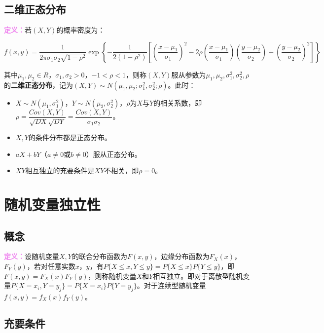 \documentclass[UTF8, 12pt]{ctexart}
\begin{document}
\subsection{二维正态分布}

\textcolor{violet}{\textbf{定义：}}若$(X,Y)$的概率密度为：

{\fontsize{8.2pt}{10pt}$f(x,y)=\dfrac{1}{2\pi\sigma_1\sigma_2\sqrt{1-\rho^2}}\exp\left\{-\dfrac{1}{2(1-\rho^2)}\left[\left(\dfrac{x-\mu_1}{\sigma_1}\right)^2-2\rho\left(\dfrac{x-\mu_1}{\sigma_1}\right)\left(\dfrac{y-\mu_2}{\sigma_2}\right)+\left(\dfrac{y-\mu_2}{\sigma_2}\right)^2\right]\right\}$}

其中$\mu_1,\mu_2\in R$，$\sigma_1,\sigma_2>0$，$-1<\rho<1$，则称$(X,Y)$服从参数为$\mu_1,\mu_2,\sigma_1^2,\sigma_2^2,\rho$的\textbf{二维正态分布}，记为$(X,Y)\sim N(\mu_1,\mu_2;\sigma_1^2,\sigma_2^2;\rho)$。此时：

\begin{itemize}
    \item $X\sim N(\mu_1,\sigma_1^2)$，$Y\sim N(\mu_2,\sigma_2^2)$，$\rho$为$X$与$Y$的相关系数，即$\rho=\dfrac{Cov(X,Y)}{\sqrt{DX}\sqrt{DY}}=\dfrac{Cov(X,Y)}{\sigma_1\sigma_2}$。
    \item $X,Y$的条件分布都是正态分布。
    \item $aX+bY$（$a\neq0$或$b\neq0$）服从正态分布。
    \item $XY$相互独立的充要条件是$XY$不相关，即$\rho=0$。
\end{itemize}

\section{随机变量独立性}

\subsection{概念}

\textcolor{violet}{\textbf{定义：}}设随机变量$X,Y$的联合分布函数为$F(x,y)$，边缘分布函数为$F_X(x)$，$F_Y(y)$，若对任意实数$x$，$y$，有$P\{X\leqslant x,Y\leqslant y\}=P\{X\leqslant x\}P\{Y\leqslant y\}$，即$F(x,y)=F_X(x)F_Y(y)$，则称随机变量$X$和$Y$相互独立。即对于离散型随机变量$P\{X=x_i,Y=y_j\}=P\{X=x_i\}P\{Y=y_j\}$。对于连续型随机变量$f(x,y)=f_X(x)f_Y(y)$。

\subsection{充要条件}
\end{document}
